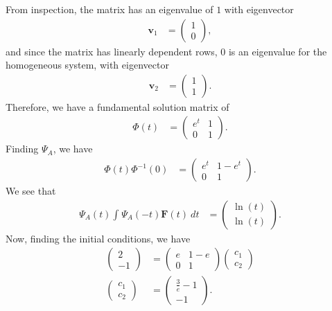 \documentclass[10pt]{mypackage}
\begin{document}
\begin{solution}[8.3, Problem 32]
  From inspection, the matrix has an eigenvalue of $1$ with eigenvector
  \begin{align*}
    \mathbf{v}_1 &= \begin{pmatrix}1\\0\end{pmatrix},
  \end{align*}
  and since the matrix has linearly dependent rows, $0$ is an eigenvalue for the homogeneous system, with eigenvector
  \begin{align*}
    \mathbf{v}_2 &= \begin{pmatrix}1\\1\end{pmatrix}.
  \end{align*}
  Therefore, we have a fundamental solution matrix of
  \begin{align*}
    \Phi(t) &= \begin{pmatrix}e^{t} & 1 \\ 0 & 1\end{pmatrix}.
  \end{align*}
  Finding $\Psi_A$, we have
  \begin{align*}
    \Phi(t)\Phi^{-1}(0) &= \begin{pmatrix}e^{t} & 1 - e^{t} \\ 0 & 1\end{pmatrix}.
  \end{align*}
  We see that
  \begin{align*}
    \Psi_A(t)\int_{}^{} \Psi_A(-t)\mathbf{F}(t)\:dt &= \begin{pmatrix}\ln(t)\\\ln(t)\end{pmatrix}.
  \end{align*}
  Now, finding the initial conditions, we have
  \begin{align*}
    \begin{pmatrix}2\\-1\end{pmatrix} &= \begin{pmatrix}e & 1-e \\ 0 & 1\end{pmatrix} \begin{pmatrix}c_1\\c_2\end{pmatrix}\\
    \begin{pmatrix}c_1\\c_2\end{pmatrix} &= \begin{pmatrix}\frac{3}{e}-1\\-1\end{pmatrix}.

\end{align*}
\end{solution}
\end{document}
